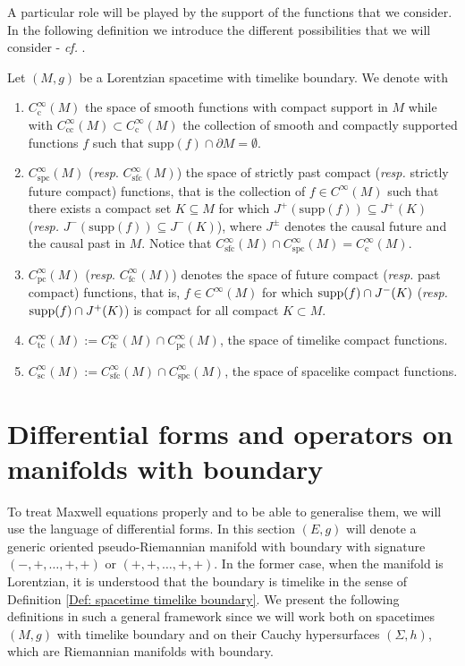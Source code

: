  A particular role will be played by the support of the functions that we consider. In the following definition we introduce the different possibilities that we will consider - \textit{cf.} \cite{Baer-15}.
\begin{Definition}\label{Def: space of forms}
	Let $(M,g)$ be a Lorentzian spacetime with timelike boundary. We denote with 
	\begin{enumerate}
		\item 	$ C^\infty_{\mathrm{c}}(M)$ the space of smooth functions with compact support in $M$ while with $ C^\infty_{\mathrm{cc}}(M)\subset C^\infty_{\mathrm{c}}(M)$ the collection of smooth and compactly supported functions $ f$ such that $\textrm{supp}( f)\cap\partial M=\emptyset$.
		\item
		$ C^\infty_{\mathrm{spc}}(M)$ (\textit{resp}. $ C^\infty_{\mathrm{sfc}}(M)$) the space of strictly past compact (\textit{resp.} strictly future compact) functions, that is the collection of $ f\in C^\infty(M)$ such that there exists a compact set $K\subseteq M$ for which $J^+(\textrm{supp}( f))\subseteq J^+(K)$ (\textit{resp.} $J^-(\textrm{supp}( f))\subseteq J^-(K)$), where $J^\pm$ denotes the causal future and the causal past in $M$.  Notice that $ C^\infty_{\mathrm{sfc}}(M)\cap C^\infty_{\mathrm{spc}}(M)= C^\infty_{\mathrm{c}}(M)$.
		\item
		$ C^\infty_{\mathrm{pc}}(M)$ (\textit{resp}. $ C^\infty_{\mathrm{fc}}(M)$) denotes the space of future compact (\textit{resp.} past compact) functions, that is, $ f\in C^\infty(M)$ for which
		${\rm supp}( f)\cap J^-(K)$ (\textit{resp.} ${\rm supp}( f)\cap J^+(K)$) is compact for all compact $K\subset M$.
		\item $ C^\infty_{\mathrm{tc}}(M):= C^\infty_{\mathrm{fc}}(M)\cap C^\infty_{\mathrm{pc}}(M)$, the space of timelike compact functions.
		\item $ C^\infty_{\mathrm{sc}}(M):= C^\infty_{\mathrm{sfc}}(M)\cap C^\infty_{\mathrm{spc}}(M)$, the space of spacelike compact functions.
	\end{enumerate}
\end{Definition}

\section{Differential forms and operators on manifolds with boundary}

To treat Maxwell equations properly and to be able to generalise them, we will use the language of differential forms.
In this section $(E,g)$ will denote a generic oriented pseudo-Riemannian manifold with boundary with signature $(-,+,\dots,+,+)$ or $(+,+,\dots,+,+)$. In the former case, when the manifold is Lorentzian, it is understood that the boundary is timelike in the sense of Definition \ref{Def: spacetime timelike boundary}. We present the following definitions in such a general framework since we will work both on spacetimes $(M,g)$ with timelike boundary and on their Cauchy hypersurfaces $(\Sigma,h)$, which are Riemannian manifolds with boundary.\\




